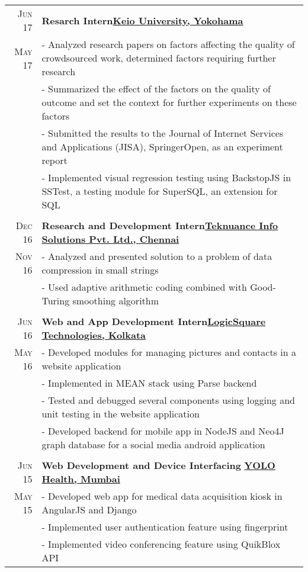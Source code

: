 \documentclass[a4paper,11pt]{extarticle} %
\begin{document}
\begin{tabular}{r|p{18cm}}

\textsc{Jun 17} & \textbf{Resarch Intern}\hfill\textbf{\href{https://www.keio.ac.jp/en/}{Keio University, Yokohama}}\\
\textsc{May 17}& \footnotesize{- Analyzed research papers on factors affecting the quality of crowdsourced work, determined factors requiring further research}\\
& \footnotesize{- Summarized the effect of the factors on the quality of outcome and set the context for further experiments on these factors}\\
& \footnotesize{- Submitted the results to the Journal of Internet Services and Applications (JISA), SpringerOpen, as an experiment report}\\
& \footnotesize{- Implemented visual regression testing using BackstopJS in SSTest, a testing module for SuperSQL, an extension for SQL}\\
\multicolumn{2}{c}{} \\

\textsc{Dec 16} & \textbf{Research and Development Intern}\hfill\textbf{\href{http://www.teknuance.com/}{Teknuance Info Solutions Pvt. Ltd., Chennai}}\\
\textsc{Nov 16} & \footnotesize{- Analyzed and presented solution to a problem of data compression in small strings}\\
& \footnotesize{- Used adaptive arithmetic coding combined with Good-Turing smoothing algorithm}\\
\multicolumn{2}{c}{}\\

\textsc{Jun 16} & \textbf{Web and App Development Intern}\hfill\textbf{\href{http://www.logic-square.com/}{LogicSquare Technologies, Kolkata}}\\
\textsc{May 16}& \footnotesize{- Developed modules for managing pictures and contacts in a website application}\\
& \footnotesize{- Implemented in MEAN stack using Parse backend}\\
& \footnotesize{- Tested and debugged several components using logging and unit testing in the website application}\\
& \footnotesize{- Developed backend for mobile app in NodeJS and Neo4J graph database for a social media android application}\\
\multicolumn{2}{c}{} \\

\textsc{Jun 15} & \textbf{Web Development and Device Interfacing} \hfill\textbf{\href{https://yolohealth.in/}{YOLO Health, Mumbai}}\\
\textsc{May 15} & \footnotesize{- Developed web app for medical data acquisition kiosk in AngularJS and Django}\\
& \footnotesize{- Implemented user authentication feature using fingerprint}\\
& \footnotesize{- Implemented video conferencing feature using QuikBlox API}\\
\end{tabular}
\end{document}
